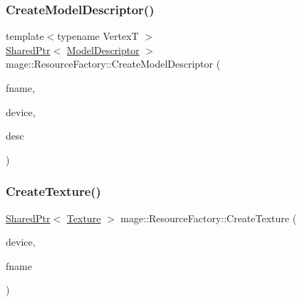 \hypertarget{classmage_1_1_resource_factory_af39d72641cc34c6d9c37699f6a904df3}{}\label{classmage_1_1_resource_factory_af39d72641cc34c6d9c37699f6a904df3} 
\subsubsection{\texorpdfstring{Create\+Model\+Descriptor()}{CreateModelDescriptor()}}
{\footnotesize\ttfamily template$<$typename VertexT $>$ \\
\hyperlink{namespacemage_a1e01ae66713838a7a67d30e44c67703e}{Shared\+Ptr}$<$ \hyperlink{classmage_1_1_model_descriptor}{Model\+Descriptor} $>$ mage\+::\+Resource\+Factory\+::\+Create\+Model\+Descriptor (\begin{DoxyParamCaption}\item[{const wstring \&}]{fname,  }\item[{\hyperlink{namespacemage_ae74f374780900893caa5555d1031fd79}{Com\+Ptr}$<$ I\+D3\+D11\+Device2 $>$}]{device,  }\item[{const \hyperlink{structmage_1_1_mesh_descriptor}{Mesh\+Descriptor}$<$ VertexT $>$ \&}]{desc }\end{DoxyParamCaption})}

\hypertarget{classmage_1_1_resource_factory_a68770835276ed7baa2bc99bda9d8b41a}{}\label{classmage_1_1_resource_factory_a68770835276ed7baa2bc99bda9d8b41a} 
\subsubsection{\texorpdfstring{Create\+Texture()}{CreateTexture()}}
{\footnotesize\ttfamily \hyperlink{namespacemage_a1e01ae66713838a7a67d30e44c67703e}{Shared\+Ptr}$<$ \hyperlink{classmage_1_1_texture}{Texture} $>$ mage\+::\+Resource\+Factory\+::\+Create\+Texture (\begin{DoxyParamCaption}\item[{\hyperlink{namespacemage_ae74f374780900893caa5555d1031fd79}{Com\+Ptr}$<$ I\+D3\+D11\+Device2 $>$}]{device,  }\item[{const wstring \&}]{fname }\end{DoxyParamCaption})}

